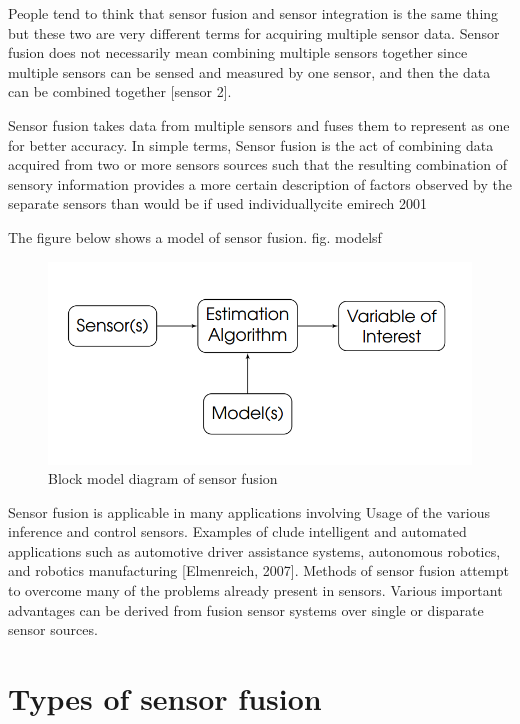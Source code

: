 People tend to think that sensor fusion and sensor integration is the same thing but these two are very different terms for acquiring multiple sensor data. Sensor fusion does not necessarily mean combining multiple sensors together since multiple sensors can be sensed and measured by one sensor, and then the data can be combined together [sensor 2].

Sensor fusion takes data from multiple sensors and fuses them to represent as one for better accuracy.
In simple terms,  Sensor fusion is the act of combining data acquired from two or more sensors sources such that the resulting combination of sensory information provides a more certain description of factors observed by the separate sensors than would be if used individually{cite emirech 2001}

The figure below shows a model of sensor fusion.
fig. modelsf

\begin{figure}[h]
  \centering
    \includegraphics[width=\linewidth]{figures/modelsf.png}
    \caption{ Block model diagram of sensor fusion }
\label{fig:modelsf}
\end{figure}



Sensor fusion is applicable in many applications involving
Usage of the various inference and control sensors. Examples of clude intelligent and automated applications such as automotive driver assistance systems, autonomous robotics, and robotics manufacturing [Elmenreich, 2007]. Methods of sensor fusion attempt to overcome many of the problems already present in sensors. Various important advantages can be derived from fusion sensor systems over single or disparate sensor sources.







\section{Types of sensor fusion}




